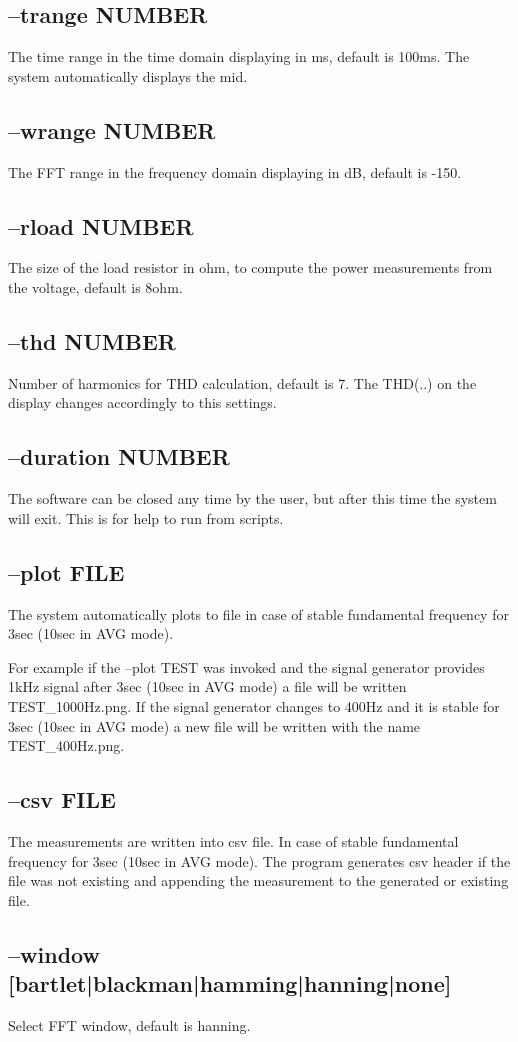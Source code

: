 \documentclass[10pt,a4paper]{article}
\begin{document}
\subsection{--trange NUMBER}
The time range in the time domain displaying in ms, default is 100ms. The system automatically displays the mid.
\subsection{--wrange NUMBER}
The FFT range in the frequency domain displaying in dB, default is -150.
\subsection{--rload NUMBER} 
The size of the load resistor in ohm, to compute the power measurements from the voltage, default is 8ohm.
\subsection{--thd NUMBER}
Number of harmonics for THD calculation, default is 7. The THD(..) on the display changes accordingly to this settings.
\subsection{--duration NUMBER}
The software can be closed any time by the user, but after this time the system will exit. This is for help to run from scripts.
\subsection{--plot FILE}
The system automatically plots to file in case of stable fundamental frequency for 3sec (10sec in AVG mode). 

For example if the --plot TEST was invoked and the signal generator provides 1kHz signal after 3sec (10sec in AVG mode) a file will be written TEST\_1000Hz.png. If the signal generator changes to 400Hz and it is stable for 3sec (10sec in AVG mode) a new file will be written with the name TEST\_400Hz.png.
\subsection{--csv FILE}
The measurements are written into csv file. In case of stable fundamental frequency for 3sec (10sec in AVG mode). The program generates csv header if the file was not existing and appending the measurement to the generated or existing file.
\subsection{--window [bartlet|blackman|hamming|hanning|none]}
Select FFT window, default is hanning.
\end{document}

